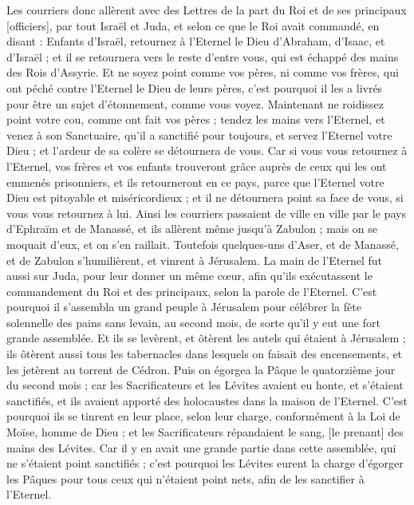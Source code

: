 \begin{multicols}{2}
Les courriers donc allèrent avec des Lettres de la part du Roi et de ses principaux [officiers], par tout Israël et Juda, et selon ce que le Roi avait commandé, en disant : Enfants d'Israël, retournez à l'Eternel le Dieu d'Abraham, d'Isaac, et d'Israël ; et il se retournera vers le reste d'entre vous, qui est échappé des mains des Rois d'Assyrie.
Et ne soyez point comme vos pères, ni comme vos frères, qui ont péché contre l'Eternel le Dieu de leurs pères, c'est pourquoi il les a livrés pour être un sujet d'étonnement, comme vous voyez.
Maintenant ne roidissez point votre cou, comme ont fait vos pères ; tendez les mains vers l'Eternel, et venez à son Sanctuaire, qu'il a sanctifié pour toujours, et servez l'Eternel votre Dieu ; et l'ardeur de sa colère se détournera de vous.
Car si vous vous retournez à l'Eternel, vos frères et vos enfants trouveront grâce auprès de ceux qui les ont emmenés prisonniers, et ils retourneront en ce pays, parce que l'Eternel votre Dieu est pitoyable et miséricordieux ; et il ne détournera point sa face de vous, si vous vous retournez à lui.
Ainsi les courriers passaient de ville en ville par le pays d'Ephraïm et de Manassé, et ils allèrent même jusqu'à Zabulon ; mais on se moquait d'eux, et on s'en raillait.
Toutefois quelques-uns d'Aser, et de Manassé, et de Zabulon s'humilièrent, et vinrent à Jérusalem.
La main de l'Eternel fut aussi sur Juda, pour leur donner un même cœur, afin qu'ils exécutassent le commandement du Roi et des principaux, selon la parole de l'Eternel.
C'est pourquoi il s'assembla un grand peuple à Jérusalem pour célébrer la fête solennelle des pains sans levain, au second mois, de sorte qu'il y eut une fort grande assemblée.
Et ils se levèrent, et ôtèrent les autels qui étaient à Jérusalem ; ils ôtèrent aussi tous les tabernacles dans lesquels on faisait des encensements, et les jetèrent au torrent de Cédron.
Puis on égorgea la Pâque le quatorzième jour du second mois ; car les Sacrificateurs et les Lévites avaient eu honte, et s'étaient sanctifiés, et ils avaient apporté des holocaustes dans la maison de l'Eternel.
C'est pourquoi ils se tinrent en leur place, selon leur charge, conformément à la Loi de Moïse, homme de Dieu ; et les Sacrificateurs répandaient le sang, [le prenant] des mains des Lévites.
Car il y en avait une grande partie dans cette assemblée, qui ne s'étaient point sanctifiés ; c'est pourquoi les Lévites eurent la charge d'égorger les Pâques pour tous ceux qui n'étaient point nets, afin de les sanctifier à l'Eternel.

\end{multicols}
